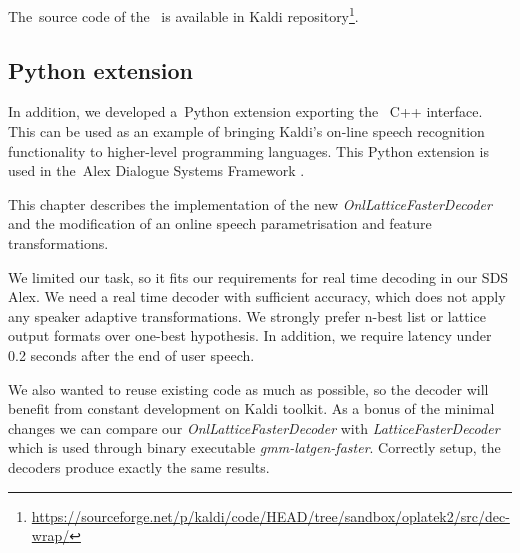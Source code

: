 
The~source code of the~ is available in Kaldi repository\footnote{\url{https://sourceforge.net/p/kaldi/code/HEAD/tree/sandbox/oplatek2/src/dec-wrap/}}.

\subsection{Python extension}

In addition, we developed a~Python extension exporting the~ C++ interface.
This can be used as an example of bringing Kaldi's on-line speech recognition functionality to higher-level programming languages.
This Python extension is used in the~Alex Dialogue Systems Framework \cite{asdf2014url}.

This chapter describes the implementation
of the new {\it OnlLatticeFasterDecoder}\/ and 
the modification of an online speech parametrisation and feature transformations.

We limited our task, so it fits our requirements for real time decoding
in our \ac{SDS} Alex.
We need a real time decoder with sufficient accuracy,
which does not apply any speaker adaptive transformations.
We strongly prefer n-best list or lattice output formats over one-best hypothesis.
In addition, we require latency under 0.2 seconds after the end of user speech.

We also wanted to reuse existing code as much as possible,
so the decoder will benefit from constant development on Kaldi toolkit.
As a bonus of the minimal changes we can compare our {\it OnlLatticeFasterDecoder}\/ 
with {\it LatticeFasterDecoder}\/ which is used through binary executable {\it gmm-latgen-faster}.
Correctly setup, the decoders produce exactly the same results.


